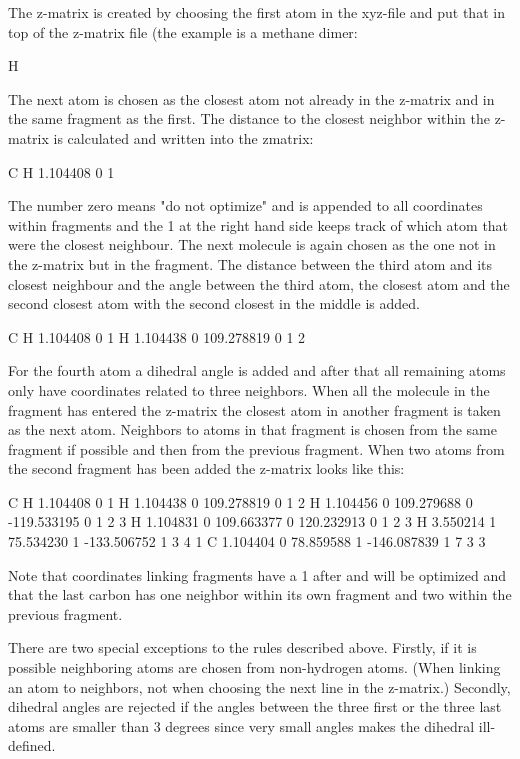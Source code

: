 The z-matrix is created by choosing the first atom in the xyz-file and put that
 in top of the z-matrix file (the example is a methane dimer:
\begin{sourcelisting}
H 
\end{sourcelisting}
The next atom is chosen as the closest atom not already in the z-matrix and in
 the same fragment 
as the first. The distance to the closest neighbor within the z-matrix is
 calculated and written into the zmatrix:
\begin{sourcelisting}
C
H   1.104408  0                         1 
\end{sourcelisting}
The number zero means "do not optimize" and is appended to all coordinates
 within fragments and the 1 at the right hand side keeps track of which
 atom that were the closest neighbour. The next molecule is again chosen
 as the one not in the z-matrix but in the fragment. The distance between
 the third atom and its closest neighbour and the angle between the third
 atom, the closest atom and the second closest atom with the second closest
 in the middle is added.
\begin{sourcelisting}
C 
H     1.104408 0                                 1
H     1.104438 0   109.278819 0                  1   2
\end{sourcelisting}
For the fourth atom a dihedral angle is added and after that all remaining atoms
 only have coordinates related to three neighbors. When all the molecule in the
 fragment has entered the z-matrix the closest atom in another fragment is taken
 as the next atom. Neighbors to atoms in that fragment is chosen from the same
 fragment if possible and then from the previous fragment. When two atoms from
 the second fragment has been added the z-matrix looks like this:
\begin{sourcelisting}
C 
H     1.104408 0                                 1
H     1.104438 0   109.278819 0                  1   2
H     1.104456 0   109.279688 0  -119.533195 0   1   2   3
H     1.104831 0   109.663377 0   120.232913 0   1   2   3
H     3.550214 1    75.534230 1  -133.506752 1   3   4   1
C     1.104404 0    78.859588 1  -146.087839 1   7   3   3 
\end{sourcelisting}
Note that coordinates linking fragments have a 1 after and will be optimized
 and that the last carbon has one neighbor within its own fragment and two
 within the previous fragment.

There are two special exceptions to the rules described above. Firstly, if
 it is possible neighboring atoms are chosen from non-hydrogen atoms. (When
 linking an atom to neighbors, not when choosing the next line in the z-matrix.)
 Secondly, dihedral angles are rejected if the angles between the three first or
 the three last atoms are smaller than 3 degrees since very small angles makes
 the dihedral ill-defined.

